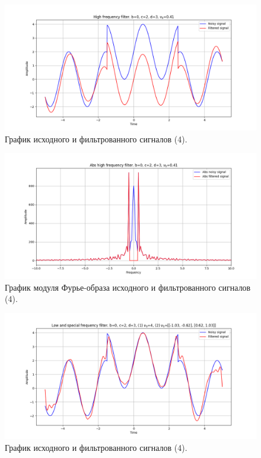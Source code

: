\documentclass[a4paper, 12pt]{article}
\begin{document}
    \begin{figure}[!htb]
        \centering
        \includegraphics[scale=0.48]{4_2_u_flt_u_nospec.png}
        \captionsetup{skip=0pt}
        \caption{График исходного и фильтрованного сигналов (4).}
        \label{fig:fig105}
    \end{figure}
    \begin{figure}[!htb]
        \centering
        \includegraphics[scale=0.48]{4_2_abs_u_U_nospec.png}
        \captionsetup{skip=0pt}
        \caption{График модуля Фурье-образа исходного и фильтрованного сигналов (4).}
        \label{fig:fig106}
    \end{figure}
    \begin{figure}[!htb]
        \centering
        \includegraphics[scale=0.48]{4_3_u_flt_u_nospec.png}
        \captionsetup{skip=0pt}
        \caption{График исходного и фильтрованного сигналов (4).}
        \label{fig:fig107}
    \end{figure}
\end{document}
